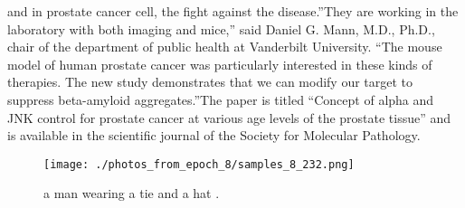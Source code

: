 \documentclass{article}%
\begin{document}
and in prostate cancer cell, the fight against the disease.”They are working in the laboratory with both imaging and mice,” said Daniel G. Mann, M.D., Ph.D., chair of the department of public health at Vanderbilt University. “The mouse model of human prostate cancer was particularly interested in these kinds of therapies. The new study demonstrates that we can modify our target to suppress beta{-}amyloid aggregates.”The paper is titled “Concept of alpha and JNK control for prostate cancer at various age levels of the prostate tissue” and is available in the scientific journal of the Society for Molecular Pathology.\newline%

%


\begin{figure}[h!]%
\centering%
\texttt{[image: ./photos\_from\_epoch\_8/samples\_8\_232.png]}%
\caption{a man wearing a tie and a hat .}%
\end{figure}

%
\end{document}
